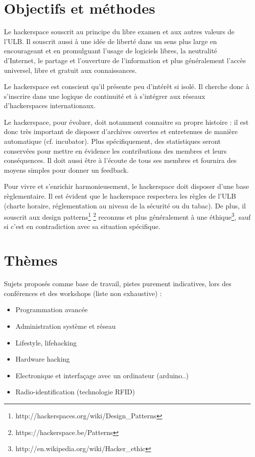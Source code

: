 \documentclass{article}
\begin{document}
\section{Objectifs et méthodes}

Le hackerspace souscrit au principe du libre examen et aux autres valeurs de l'ULB.
Il souscrit aussi à une idée de liberté dans un sens plus large en encourageant et en promulguant l'usage de logiciels libres, la neutralité d'Internet, le partage et l'ouverture de 
l'information et plus généralement l'accès universel, libre et gratuit aux connaissances.

Le hackerspace est conscient qu'il présente peu d'intérêt si isolé. Il cherche donc 
à s'inscrire dans une logique de continuité et à s'intégrer aux réseaux d'hackerspaces 
internationaux.

Le hackerspace, pour évoluer, doit notamment connaitre sa propre histoire : il est 
donc très important de disposer d'archives ouvertes et entretenues de manière 
automatique (cf. incubator). Plus spécifiquement, des statistiques seront 
conservées pour mettre en évidence les contributions des membres et leurs conséquences. 
Il doit aussi être à l'écoute de tous ses membres et fournira des moyens simples pour 
donner un feedback. 

Pour vivre et s'enrichir harmonieusement, le hackerspace doit disposer d'une base 
règlementaire. Il est évident que le hackerspace respectera les règles de l'ULB 
(charte horaire, réglementation au niveau de la sécurité ou du tabac). De plus, il souscrit aux 
design patterns\footnote{http://hackerspaces.org/wiki/Design\_Patterns}
\footnote{https://hackerspace.be/Patterns} reconnus et plus généralement à une 
éthique\footnote{http://en.wikipedia.org/wiki/Hacker\_ethic}, sauf si c'est en 
contradiction avec sa situation spécifique.


\section{Thèmes}

Sujets proposés comme base de travail, pistes purement indicatives, lors des 
conférences et des workshops (liste non exhaustive) :
\begin{itemize}
\item Programmation avancée
\item Administration système et réseau
\item Lifestyle, lifehacking
\item Hardware hacking
\item Electronique et interfaçage avec un ordinateur (arduino..)
\item Radio-identification (technologie RFID)
\end{itemize}
\end{document}
